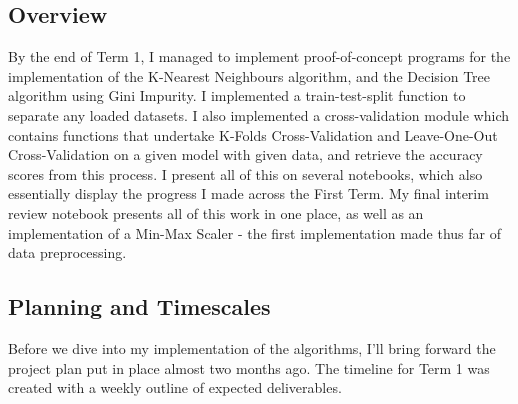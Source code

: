 \documentclass[letterpaper,10pt]{article}
\begin{document}
\subsection{Overview}
By the end of Term 1, I managed to implement proof-of-concept programs for the implementation of the K-Nearest Neighbours algorithm, and the Decision Tree algorithm using Gini Impurity. I implemented a train-test-split function to separate any loaded datasets. I also implemented a cross-validation module which contains functions that undertake K-Folds Cross-Validation and Leave-One-Out Cross-Validation on a given model with given data, and retrieve the accuracy scores from this process. I present all of this on several notebooks, which also essentially display the progress I made across the First Term. My final interim review notebook presents all of this work in one place, as well as an implementation of a Min-Max Scaler - the first implementation made thus far of data preprocessing.\par

\newpage
\subsection{Planning and Timescales} \label{plan}
Before we dive into my implementation of the algorithms, I'll bring forward the project plan put in place almost two months ago. The timeline for Term 1 was created with a weekly outline of expected deliverables. \par
\end{document}
